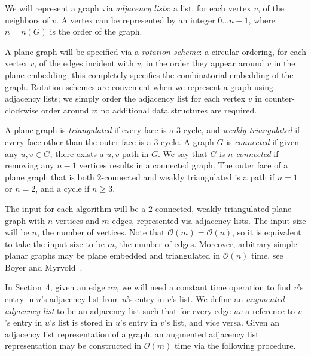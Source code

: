 \documentclass[12pt,letterpaper]{article}
\theoremstyle{plain}
\theoremstyle{definition}
\theoremstyle{break}
\newcommand{\defterm}[1]{\emph{#1}} %
\begin{document}
We will represent a graph via \textit{adjacency lists}:
a list, for each vertex $v$, of the neighbors of $v$.
A vertex can be represented by an integer $0\dots n-1$,
where $n=n(G)$ is the order of the graph.

A plane graph will be specified via
a \defterm{rotation scheme}:
a circular ordering,
for each vertex $v$, of the edges incident with $v$,
in the order they appear around $v$ in the plane embedding;
this completely specifies
the combinatorial embedding of the graph.
Rotation schemes are convenient when we represent a graph
using adjacency lists;
we simply order the adjacency
list for each vertex $v$ in counter-clockwise order around $v$;
no additional data structures are required.

A plane graph is \defterm{triangulated} if every face is a $3$-cycle, and
\defterm{weakly triangulated} if every face other than the
outer face is a $3$-cycle.
A graph $G$ is \defterm{connected} if given any $u,v\in G$, there exists a $u,v$-path in $G$.
We say that $G$ is \defterm{$n$-connected} if removing any $n-1$ vertices results in a
connected graph. The outer face of a plane graph that is both $2$-connected
and weakly triangulated is a path if $n=1$ or $n=2$, and a cycle if $n\ge 3$. 

The input for each algorithm will be a $2$-connected,
weakly triangulated plane graph with $n$ vertices and $m$ edges, represented
via adjacency lists. The input size will be $n$, the number of vertices. Note
that $\mathcal{O}(m)=\mathcal{O}(n)$, so it is equivalent to take the input size
to be $m$, the number of edges. Moreover, arbitrary simple planar graphs may be
plane embedded and triangulated in $\mathcal{O}(n)$ time, see Boyer and
Myrvold~\cite{BoMy2004}.

In Section~4, given an edge $uv$, we will need a constant time operation to
find $v$'s entry in $u$'s adjacency list from $u$'s entry in $v$'s list.
We define an \defterm{augmented adjacency list} to be an adjacency list such
that for
every edge $uv$ a reference to $v$'s entry in
$u$'s list is stored in $u$'s entry in $v$'s list, and vice versa. Given an
adjacency list representation of a graph, an augmented
adjacency list representation may be constructed in $\mathcal{O}(m)$ time via
the following procedure.
\end{document}
